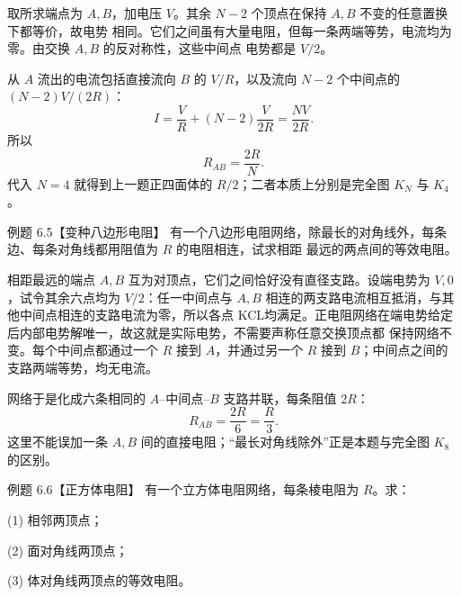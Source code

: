 \begin{xesolution}
取所求端点为 $A,B$，加电压 $V$。其余 $N-2$ 个顶点在保持 $A,B$ 不变的任意置换下都等价，故电势
相同。它们之间虽有大量电阻，但每一条两端等势，电流均为零。由交换 $A,B$ 的反对称性，这些中间点
电势都是 $V/2$。

从 $A$ 流出的电流包括直接流向 $B$ 的 $V/R$，以及流向 $N-2$ 个中间点的
$(N-2)V/(2R)$：
\[
  I=\frac VR+(N-2)\frac{V}{2R}=\frac{NV}{2R}.
\]
所以
\[
  \boxed{R_{AB}=\frac{2R}{N}}.
\]
代入 $N=4$ 就得到上一题正四面体的 $R/2$；二者本质上分别是完全图 $K_N$ 与 $K_4$。

\completeGraphReductionFigure
{}
\end{xesolution}

\begin{origexamplebox}{例题 6.5【变种八边形电阻】}
有一个八边形电阻网络，除最长的对角线外，每条边、每条对角线都用阻值为 $R$ 的电阻相连，试求相距
最远的两点间的等效电阻。
\octagonProblemFigure
{}
\end{origexamplebox}



\begin{xesolution}
相距最远的端点 $A,B$ 互为对顶点，它们之间恰好没有直径支路。设端电势为 $V,0$，试令其余六点均为
$V/2$：任一中间点与 $A,B$ 相连的两支路电流相互抵消，与其他中间点相连的支路电流为零，所以各点
KCL均满足。正电阻网络在端电势给定后内部电势解唯一，故这就是实际电势，不需要声称任意交换顶点都
保持网络不变。每个中间点都通过一个 $R$ 接到 $A$，并通过另一个 $R$ 接到
$B$；中间点之间的支路两端等势，均无电流。

网络于是化成六条相同的 $A$--中间点--$B$ 支路并联，每条阻值 $2R$：
\[
  \boxed{R_{AB}=\frac{2R}{6}=\frac R3}.
\]
这里不能误加一条 $A,B$ 间的直接电阻；“最长对角线除外”正是本题与完全图 $K_8$ 的区别。

\octagonReductionFigure
{}
\end{xesolution}

\begin{origexamplebox}{例题 6.6【正方体电阻】}
有一个立方体电阻网络，每条棱电阻为 $R$。求：

(1) 相邻两顶点；

(2) 面对角线两顶点；

(3) 体对角线两顶点的等效电阻。
\cubeProblemFigure
{}
\end{origexamplebox}



